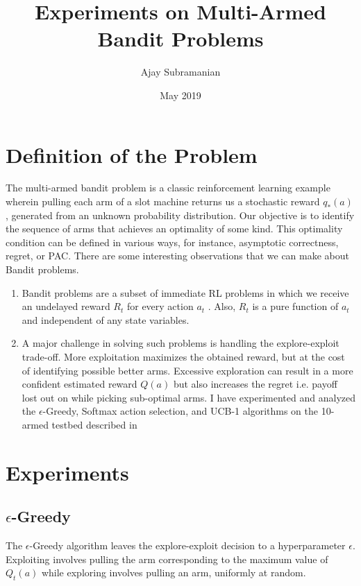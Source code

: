 \documentclass[12pt]{extarticle}
\title{Experiments on Multi-Armed Bandit Problems}
\author{Ajay Subramanian}
\date{May 2019}
\begin{document}
\maketitle

\setcounter{secnumdepth}{0}

\section{Definition of the Problem}
The multi-armed bandit problem is a classic reinforcement learning example wherein pulling each arm of a slot machine returns us a stochastic reward $q_*(a)$, generated from an unknown probability distribution. Our objective is to identify the sequence of arms that achieves an optimality of some kind. This optimality condition can be defined in various ways, for instance, asymptotic correctness, regret, or PAC. There are some interesting observations that we can make about Bandit problems.

\begin{enumerate}
	\item Bandit problems are a subset of immediate RL problems in which we receive an undelayed reward $R_t$ for every action $a_t$ . Also, $R_t$ is a pure function of $a_t$ and independent of any state variables.
	\item A major challenge in solving such problems is handling the explore-exploit trade-off. More exploitation maximizes the obtained reward, but at the cost of identifying possible better arms. Excessive exploration can result in a more confident estimated reward $Q(a)$ but also increases the regret i.e. payoff lost out on while picking sub-optimal arms.
I have experimented and analyzed the $\epsilon$-Greedy, Softmax action selection, and UCB-1 algorithms on the 10-armed testbed described in \cite{Sutton1998}
\end{enumerate}

\section{Experiments}

\subsection{$\epsilon$-Greedy}

The $\epsilon$-Greedy algorithm leaves the explore-exploit decision to a hyperparameter $\epsilon$. Exploiting involves pulling the arm corresponding to the maximum value of $Q_t(a)$ while exploring involves pulling an arm, uniformly at random.
\end{document}
